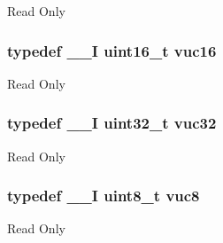 Read Only \hypertarget{group___exported__types_ga7f6037565f0caa27727c8b871daf0d56}{
\subsubsection[{vuc16}]{\setlength{\rightskip}{0pt plus 5cm}typedef {\bf \-\_\-\-\_\-\-I} uint16\-\_\-t {\bf vuc16}}}\label{group___exported__types_ga7f6037565f0caa27727c8b871daf0d56}
Read Only \hypertarget{group___exported__types_ga2e08e321a35a55e72c5b3a507e76371f}{
\subsubsection[{vuc32}]{\setlength{\rightskip}{0pt plus 5cm}typedef {\bf \-\_\-\-\_\-\-I} uint32\-\_\-t {\bf vuc32}}}\label{group___exported__types_ga2e08e321a35a55e72c5b3a507e76371f}
Read Only \hypertarget{group___exported__types_gab0ec90ac9b2c5864755998c8d37c264a}{
\subsubsection[{vuc8}]{\setlength{\rightskip}{0pt plus 5cm}typedef {\bf \-\_\-\-\_\-\-I} uint8\-\_\-t {\bf vuc8}}}\label{group___exported__types_gab0ec90ac9b2c5864755998c8d37c264a}
Read Only 